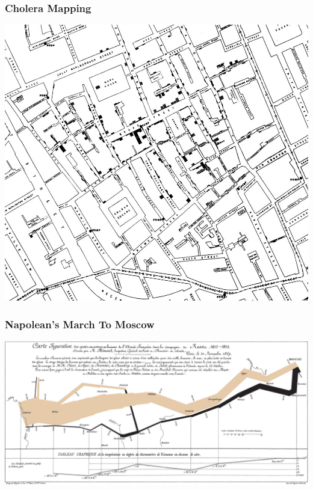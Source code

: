 \documentclass{beamer} %
\begin{document}
\begin{frame}\frametitle{Cholera Mapping}
	\centering
	\includegraphics[width=0.8\linewidth]{cholera.jpg}
\end{frame}


\begin{frame}\frametitle{Napolean's March To Moscow}
	\centering
	\includegraphics[width=\linewidth]{Minard.png}
	
\end{frame}
\end{document}
